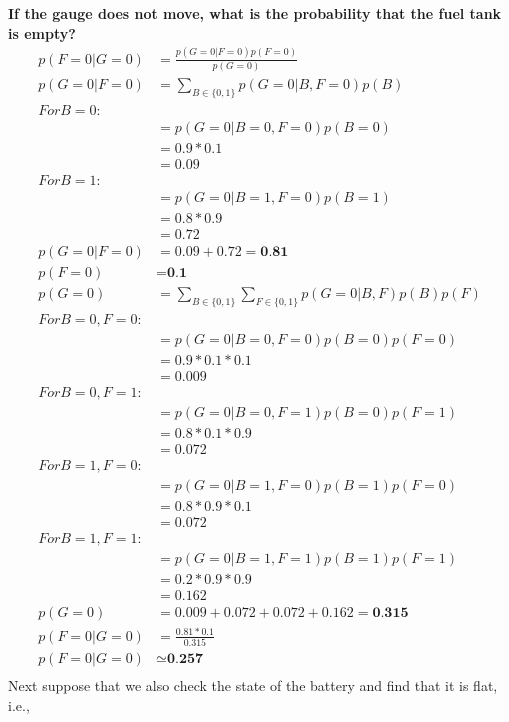 \documentclass{article}
\begin{document}
\textbf{If the gauge does not move, what is the probability that the fuel tank is empty?} \\
\begin{align*}
p(F=0|G=0) & =\frac{p(G=0|F=0)p(F=0)}{p(G=0)} \\
    p(G=0|F=0) & = \sum_{B\in \{0,1\}} p(G=0|B,F=0)p(B) \\
    For B=0: \\
    & = p(G=0|B=0,F=0)p(B=0) \\    
    & = 0.9 * 0.1 \\
    & = 0.09 \\
    For B=1: \\
    &= p(G=0|B=1,F=0)p(B=1) \\   
    & = 0.8 * 0.9 \\
    & = 0.72 \\
p(G=0|F=0) & = 0.09 + 0.72 = \textbf{0.81} \\  
p(F=0) & = \textbf{0.1} \\
p(G=0) & =  \sum_{B\in \{0,1\}}  \sum_{F\in \{0,1\}}  p(G=0|B,F)  p(B)  p(F) \\ 
For B=0, F=0: \\
     & = p(G=0|B=0,F=0)  p(B=0)  p(F=0) \\
    &= 0.9 * 0.1 * 0.1 \\
    & = 0.009 \\
For B=0, F=1: \\
     & = p(G=0|B=0,F=1)  p(B=0)  p(F=1) \\
    &= 0.8 * 0.1 * 0.9 \\
    & = 0.072 \\
For B=1, F=0: \\
     & = p(G=0|B=1,F=0)  p(B=1)  p(F=0) \\
    &= 0.8 * 0.9 * 0.1 \\
    & = 0.072 \\ 
For B=1, F=1: \\
     & = p(G=0|B=1,F=1)  p(B=1)  p(F=1) \\
    &= 0.2 * 0.9 * 0.9 \\
    & = 0.162 \\    
p(G=0) &= 0.009 + 0.072 + 0.072 + 0.162 = \textbf{0.315} \\
p(F=0|G=0) & =\frac{0.81*0.1}{0.315} \\
p(F=0|G=0) & \simeq \textbf{0.257} \\
\end{align*}
Next suppose that we also check the state of the battery and find that it is flat, i.e.,
\end{document}
